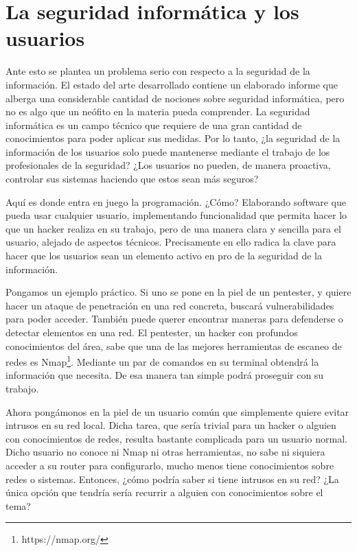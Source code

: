 \section{La seguridad informática y los usuarios}

Ante esto se plantea un problema serio con respecto a la seguridad de la información. El estado del arte desarrollado contiene un elaborado informe que alberga una considerable cantidad de nociones sobre seguridad informática, pero no es algo que un neófito en la materia pueda comprender. La seguridad informática es un campo técnico que requiere de una gran cantidad de conocimientos para poder aplicar sus medidas. Por lo tanto, ¿la seguridad de la información de los usuarios solo puede mantenerse mediante el trabajo de los profesionales de la seguridad? ¿Los usuarios no pueden, de manera proactiva, controlar sus sistemas haciendo que estos sean más seguros?

Aquí es donde entra en juego la programación. ¿Cómo? Elaborando software que pueda usar cualquier usuario, implementando funcionalidad que permita hacer lo que un hacker realiza en su trabajo, pero de una manera clara y sencilla para el usuario, alejado de aspectos técnicos. Precisamente en ello radica la clave para hacer que los usuarios sean un elemento activo en pro de la seguridad de la información.

Pongamos un ejemplo práctico. Si uno se pone en la piel de un pentester, y quiere hacer un ataque de penetración en una red concreta, buscará vulnerabilidades para poder acceder. También puede querer encontrar maneras para defenderse o detectar elementos en una red. El pentester, un hacker con profundos conocimientos del área, sabe que una de las mejores herramientas de escaneo de redes es Nmap\footnote{https://nmap.org/}. Mediante un par de comandos en su terminal obtendrá la información que necesita. De esa manera tan simple podrá proseguir con su trabajo.

Ahora pongámonos en la piel de un usuario común que simplemente quiere evitar intrusos en su red local. Dicha tarea, que sería trivial para un hacker o alguien con conocimientos de redes, resulta bastante complicada para un usuario normal. Dicho usuario no conoce ni Nmap ni otras herramientas, no sabe ni siquiera acceder a su router para configurarlo, mucho menos tiene conocimientos sobre redes o sistemas. Entonces, ¿cómo podría saber si tiene intrusos en su red? ¿La única opción que tendría sería recurrir a alguien con conocimientos sobre el tema?

